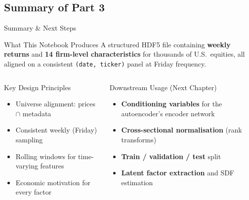\documentclass[aspectratio=169]{beamer}
\begin{document}
%
\subsection{Summary of Part 3}
%
\begin{frame}{Summary \& Next Steps}

\begin{block}{What This Notebook Produces}
A structured HDF5 file containing \textbf{weekly returns} and \textbf{14 firm-level
characteristics} for thousands of U.S.\ equities, all aligned on a consistent
\texttt{(date, ticker)} panel at Friday frequency.
\end{block}

\vspace{-0.2cm}

\begin{columns}[T]
\begin{block}{Key Design Principles}
\begin{itemize}
  \item Universe alignment: prices $\cap$ metadata
  \item Consistent weekly (Friday) sampling
  \item Rolling windows for time-varying features
  \item Economic motivation for every factor
\end{itemize}
\end{block}

\begin{block}{Downstream Usage (Next Chapter)}
\begin{itemize}
  \item \textbf{Conditioning variables} for the autoencoder's encoder network
  \item \textbf{Cross-sectional normalisation} (rank transforms)
  \item \textbf{Train / validation / test} split
  \item \textbf{Latent factor extraction} and SDF estimation
\end{itemize}
\end{block}
\end{columns}
\end{frame}
%
%
\end{document}

